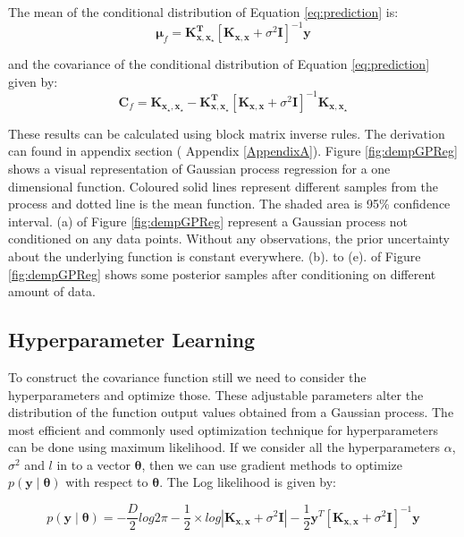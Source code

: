 The mean of the conditional distribution of Equation \ref{eq:prediction} is:
\begin{equation} \label{eq:prediction_mean}
  \boldsymbol{\mu}_f = \mathbf{K_{x,x_\star}^T} \left[ \mathbf{K_{x,x}}+ \sigma^2\mathbf{I} \right]^{-1} \mathbf{y}
\end{equation}

and the covariance of the conditional distribution of Equation \ref{eq:prediction} given by:
\begin{equation} \label{eq:prediction_cov}
  \mathbf{C}_f = \mathbf{K_{x_\star,x_\star}} -
		\mathbf{K_{x,x_\star}^T} \left[ \mathbf{K_{x,x}}+ \sigma^2\mathbf{I} \right]^{-1} \mathbf{K_{x,x_\star}}
\end{equation}

These results can be calculated using block matrix inverse rules. The derivation can found in appendix section ({\color{red} Appendix \ref{AppendixA}}). Figure \ref{fig:dempGPReg} shows a visual representation of Gaussian process regression for a one dimensional function. Coloured solid lines represent different samples from the process and dotted line is the mean function. The shaded area is 95\% confidence interval. (a) of Figure \ref{fig:dempGPReg} represent a Gaussian process not conditioned on any data points. Without any observations, the prior uncertainty about the underlying function is constant everywhere. (b). to (e). of Figure \ref{fig:dempGPReg} shows some posterior samples after conditioning on different amount of data. 



\subsection{Hyperparameter Learning}
To construct the covariance function still we need to consider the hyperparameters and optimize those. These adjustable parameters alter the distribution of the function output values obtained from a Gaussian process. The most efficient and commonly used optimization technique for hyperparameters can be done using maximum likelihood. If we consider all the hyperparameters $\alpha$, $\sigma^2$ and $l$ in to a vector $\boldsymbol{\theta}$, then we can use gradient methods to optimize $p \left(\mathbf{y}\middle|\boldsymbol{\theta}\right)$ with respect to $\boldsymbol{\theta}$. The Log likelihood is given by:

\begin{equation} \label{eq:Likelihood}
 p \left(\mathbf{y}\middle|\boldsymbol{\theta}\right) =
    - \frac{D}{2}log2\pi - \frac{1}{2}\times log \left| \mathbf{K_{x,x}} + \sigma^2\mathbf{I}\right|
    - \frac{1}{2}\mathbf{y}^T \left[\mathbf{K_{x,x}} + \sigma^2\mathbf{I} \right]^{-1}\mathbf{y}
\end{equation}

